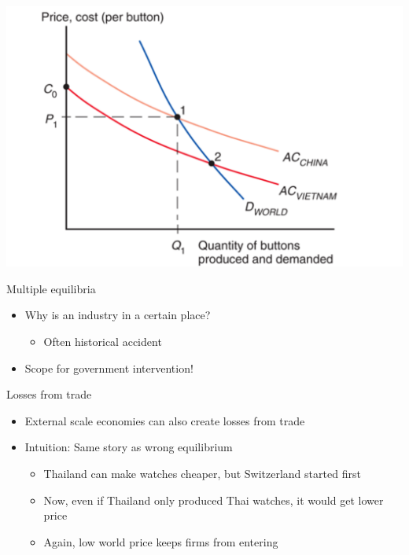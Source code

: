 \documentclass[ignorenonframetext,]{beamer}
\begin{document}
\begin{frame}

    \includegraphics[scale=0.25]{itsatrap.png}

\end{frame}

\begin{frame}{Multiple equilibria}

    \begin{itemize}
        \item Why is an industry in a certain place?
        \begin{itemize}
            \item Often historical accident
        \end{itemize}
        \item Scope for government intervention!
    \end{itemize}

\end{frame}

\begin{frame}{Losses from trade}

    \begin{itemize}
        \item External scale economies can also create losses from trade
        \item Intuition: Same story as wrong equilibrium
        \begin{itemize}
            \item Thailand can make watches cheaper, but Switzerland started first
            \item Now, even if Thailand only produced Thai watches, it would get lower price
            \item Again, low world price keeps firms from entering
        \end{itemize}
    \end{itemize}

\end{frame}
\end{document}
